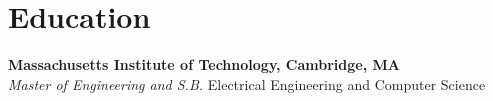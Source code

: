 \section{Education}

\textbf{Massachusetts Institute of Technology, Cambridge, MA}\\
\textit{Master of Engineering and S.B.} Electrical Engineering and Computer Science
